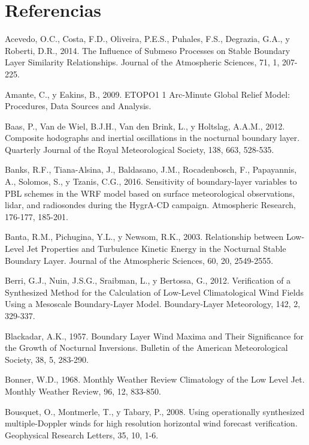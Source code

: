 \documentclass[12pt,spanish,oneside, a4paper]{book}
\begin{document}
\chapter*{Referencias}\label{referencias}

\hypertarget{refs}{}
\hypertarget{ref-Acevedo2014}{}
Acevedo, O.C., Costa, F.D., Oliveira, P.E.S., Puhales, F.S., Degrazia,
G.A., y Roberti, D.R., 2014. The Influence of Submeso Processes on
Stable Boundary Layer Similarity Relationships. Journal of the
Atmospheric Sciences, 71, 1, 207-225.

\hypertarget{ref-Amante2009}{}
Amante, C., y Eakins, B., 2009. ETOPO1 1 Arc-Minute Global Relief Model:
Procedures, Data Sources and Analysis.

\hypertarget{ref-Baas2012}{}
Baas, P., Van de Wiel, B.J.H., Van den Brink, L., y Holtslag, A.A.M.,
2012. Composite hodographs and inertial oscillations in the nocturnal
boundary layer. Quarterly Journal of the Royal Meteorological Society,
138, 663, 528-535.

\hypertarget{ref-Banks2016}{}
Banks, R.F., Tiana-Alsina, J., Baldasano, J.M., Rocadenbosch, F.,
Papayannis, A., Solomos, S., y Tzanis, C.G., 2016. Sensitivity of
boundary-layer variables to PBL schemes in the WRF model based on
surface meteorological observations, lidar, and radiosondes during the
HygrA-CD campaign. Atmospheric Research, 176-177, 185-201.

\hypertarget{ref-Banta2003}{}
Banta, R.M., Pichugina, Y.L., y Newsom, R.K., 2003. Relationship between
Low-Level Jet Properties and Turbulence Kinetic Energy in the Nocturnal
Stable Boundary Layer. Journal of the Atmospheric Sciences, 60, 20,
2549-2555.

\hypertarget{ref-Berri2012}{}
Berri, G.J., Nuin, J.S.G., Sraibman, L., y Bertossa, G., 2012.
Verification of a Synthesized Method for the Calculation of Low-Level
Climatological Wind Fields Using a Mesoscale Boundary-Layer Model.
Boundary-Layer Meteorology, 142, 2, 329-337.

\hypertarget{ref-Blackadar1957}{}
Blackadar, A.K., 1957. Boundary Layer Wind Maxima and Their Significance
for the Growth of Nocturnal Inversions. Bulletin of the American
Meteorological Society, 38, 5, 283-290.

\hypertarget{ref-Bonner1968}{}
Bonner, W.D., 1968. Monthly Weather Review Climatology of the Low Level
Jet. Monthly Weather Review, 96, 12, 833-850.

\hypertarget{ref-Bousquet2008}{}
Bousquet, O., Montmerle, T., y Tabary, P., 2008. Using operationally
synthesized multiple-Doppler winds for high resolution horizontal wind
forecast verification. Geophysical Research Letters, 35, 10, 1-6.
\end{document}
